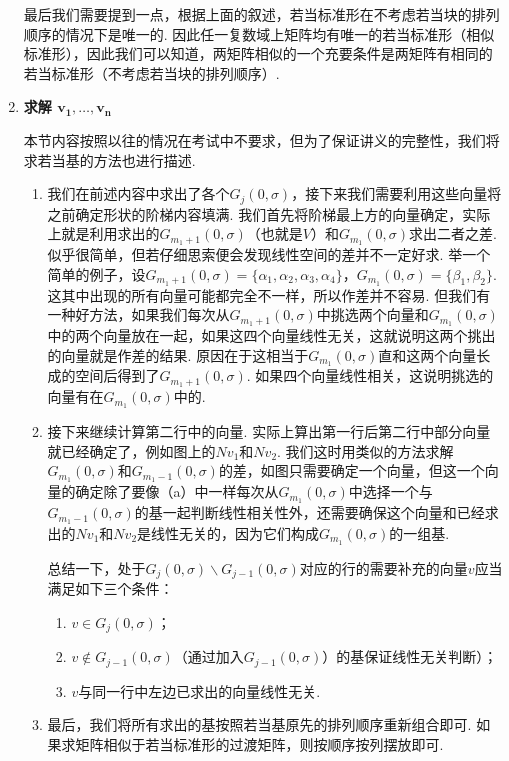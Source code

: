 \begin{enumerate}
          \begin{solution}

          \end{solution}

          最后我们需要提到一点，根据上面的叙述，若当标准形在不考虑若当块的排列顺序的情况下是唯一的. 因此任一复数域上矩阵均有唯一的若当标准形（相似标准形），因此我们可以知道，两矩阵相似的一个充要条件是两矩阵有相同的若当标准形（不考虑若当块的排列顺序）.

    \item \textbf{\heiti 求解 $\boldsymbol{v_1,\ldots,v_n}$}

          本节内容按照以往的情况在考试中不要求，但为了保证讲义的完整性，我们将求若当基的方法也进行描述.
          \begin{enumerate}
              \item 我们在前述内容中求出了各个$G_j(0,\sigma)$，接下来我们需要利用这些向量将之前确定形状的阶梯内容填满. 我们首先将阶梯最上方的向量确定，实际上就是利用求出的$G_{m_1+1}(0,\sigma)$（也就是$V$）和$G_{m_1}(0,\sigma)$求出二者之差. 似乎很简单，但若仔细思索便会发现线性空间的差并不一定好求. 举一个简单的例子，设$G_{m_1+1}(0,\sigma)=\{\alpha_1,\alpha_2,\alpha_3,\alpha_4\}$，$G_{m_1}(0,\sigma)=\{\beta_1,\beta_2\}$. 这其中出现的所有向量可能都完全不一样，所以作差并不容易. 但我们有一种好方法，如果我们每次从$G_{m_1+1}(0,\sigma)$中挑选两个向量和$G_{m_1}(0,\sigma)$中的两个向量放在一起，如果这四个向量线性无关，这就说明这两个挑出的向量就是作差的结果. 原因在于这相当于$G_{m_1}(0,\sigma)$直和这两个向量长成的空间后得到了$G_{m_1+1}(0,\sigma)$. 如果四个向量线性相关，这说明挑选的向量有在$G_{m_1}(0,\sigma)$中的.

              \item 接下来继续计算第二行中的向量. 实际上算出第一行后第二行中部分向量就已经确定了，例如图上的$Nv_1$和$Nv_2$. 我们这时用类似的方法求解$G_{m_1}(0,\sigma)$和$G_{m_1-1}(0,\sigma)$的差，如图只需要确定一个向量，但这一个向量的确定除了要像（a）中一样每次从$G_{m_1}(0,\sigma)$中选择一个与$G_{m_1-1}(0,\sigma)$的基一起判断线性相关性外，还需要确保这个向量和已经求出的$Nv_1$和$Nv_2$是线性无关的，因为它们构成$G_{m_1}(0,\sigma)$的一组基.

                    总结一下，处于$G_j(0,\sigma)\backslash G_{j-1}(0,\sigma)$对应的行的需要补充的向量$v$应当满足如下三个条件：
                    \begin{enumerate}
                        \item $v\in G_j(0,\sigma)$；

                        \item $v\notin G_{j-1}(0,\sigma)$（通过加入$G_{j-1}(0,\sigma)$）的基保证线性无关判断）；

                        \item $v$与同一行中左边已求出的向量线性无关.
                    \end{enumerate}

              \item 最后，我们将所有求出的基按照若当基原先的排列顺序重新组合即可. 如果求矩阵相似于若当标准形的过渡矩阵，则按顺序按列摆放即可.
          \end{enumerate}
\end{enumerate}
